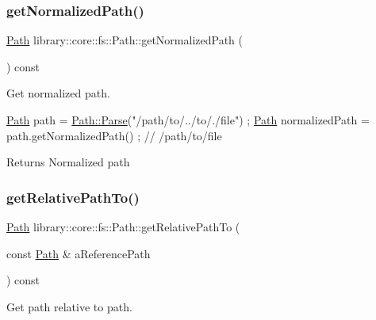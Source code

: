 \subsubsection{\texorpdfstring{get\+Normalized\+Path()}{getNormalizedPath()}}
{\footnotesize\ttfamily \hyperlink{classlibrary_1_1core_1_1fs_1_1Path}{Path} library\+::core\+::fs\+::\+Path\+::get\+Normalized\+Path (\begin{DoxyParamCaption}{ }\end{DoxyParamCaption}) const}



Get normalized path. 


\begin{DoxyCode}
\hyperlink{classlibrary_1_1core_1_1fs_1_1Path_aaba9a8e0153813f08f78f1c3275734a4}{Path} path = \hyperlink{classlibrary_1_1core_1_1fs_1_1Path_aebf5bd3af83e0b7376616e146f3e55df}{Path::Parse}(\textcolor{stringliteral}{"/path/to/../to/./file"}) ;
\hyperlink{classlibrary_1_1core_1_1fs_1_1Path_aaba9a8e0153813f08f78f1c3275734a4}{Path} normalizedPath = path.getNormalizedPath() ; \textcolor{comment}{// /path/to/file}
\end{DoxyCode}


\begin{DoxyReturn}{Returns}
Normalized path 
\end{DoxyReturn}
\mbox{\label{classlibrary_1_1core_1_1fs_1_1Path_a8f24340e887cfbfe675e96c0ba92321f}} 
\subsubsection{\texorpdfstring{get\+Relative\+Path\+To()}{getRelativePathTo()}}
{\footnotesize\ttfamily \hyperlink{classlibrary_1_1core_1_1fs_1_1Path}{Path} library\+::core\+::fs\+::\+Path\+::get\+Relative\+Path\+To (\begin{DoxyParamCaption}\item[{const \hyperlink{classlibrary_1_1core_1_1fs_1_1Path}{Path} \&}]{a\+Reference\+Path }\end{DoxyParamCaption}) const}



Get path relative to path. 



